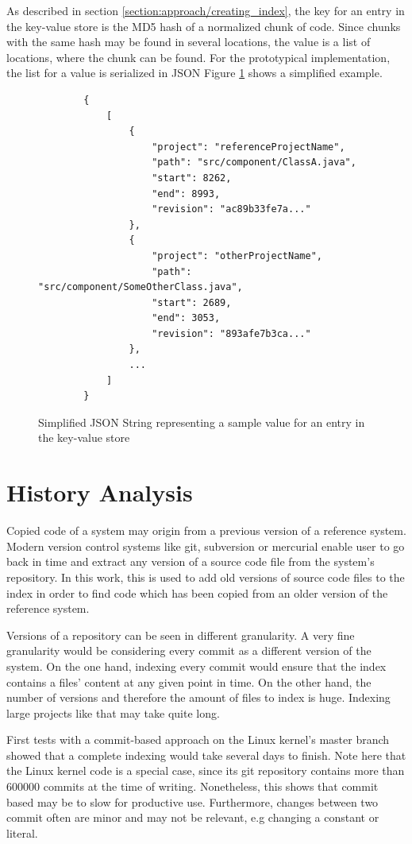 As described in section \ref{section:approach/creating_index}, the key for an entry in the key-value store is the MD5 hash of a normalized chunk of code.
Since chunks with the same hash may be found in several locations, the value is a list of locations, where the chunk can be found.
For the prototypical implementation, the list for a value is serialized in JSON
Figure \ref{fig:json_serialization} shows a simplified example.

\begin{figure}[h]
	\centering
	\begin{lstlisting}
		{
			[
				{
					"project": "referenceProjectName",
					"path": "src/component/ClassA.java",
					"start": 8262,
					"end": 8993,
					"revision": "ac89b33fe7a..."
				},
				{
					"project": "otherProjectName",
					"path": "src/component/SomeOtherClass.java",
					"start": 2689,
					"end": 3053,
					"revision": "893afe7b3ca..."
				},
				...
			]
		}
	\end{lstlisting}
	\caption{Simplified JSON String representing a sample value for an entry in the key-value store}\label{fig:json_serialization}
\end{figure}

\section{History Analysis}\label{section:implementation/history_analysis}
Copied code of a system may origin from a previous version of a reference system.
Modern version control systems like git, subversion or mercurial enable user to go back in time and extract any version of a source code file from the system's repository.
In this work, this is used to add old versions of source code files to the index in order to find code which has been copied from an older version of the reference system.

Versions of a repository can be seen in different granularity.
A very fine granularity would be considering every commit as a different version of the system.
On the one hand, indexing every commit would ensure that the index contains a files' content at any given point in time.
On the other hand, the number of versions and therefore the amount of files to index is huge.
Indexing large projects like that may take quite long.

First tests with a commit-based approach on the Linux kernel's master branch showed that a complete indexing would take several days to finish.
Note here that the Linux kernel code is a special case, since its git repository contains more than 600000 commits at the time of writing.
Nonetheless, this shows that commit based may be to slow for productive use.
Furthermore, changes between two commit often are minor and may not be relevant, e.g changing a constant or literal.

